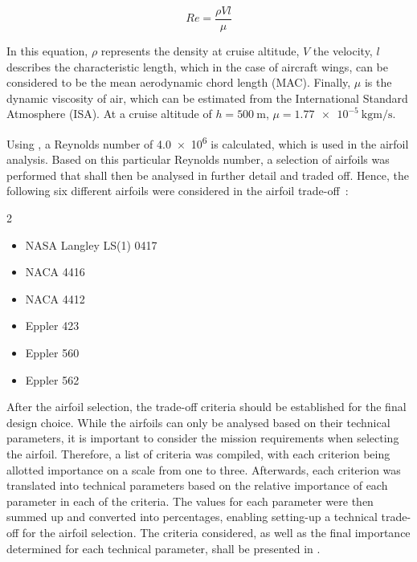 \begin{equation}
    \label{eq:reynolds}
    Re = \frac{\rho V l}{\mu} 
\end{equation}

In this equation, $\rho$ represents the density at cruise altitude, $V$ the velocity, $l$
describes the characteristic length,
which in the case of aircraft wings, can be considered to be the mean aerodynamic chord length (MAC).
Finally, $\mu$ is the dynamic viscosity of air, which can be estimated from the International Standard Atmosphere (ISA).
At a cruise altitude of $h=\qty{500}{\m}$, $\mu=\qty{1.77e-5}{\kg\m\per\s}$.

Using , a Reynolds number of \num{4.0e6} is calculated, which is used in the airfoil analysis.
Based on this particular Reynolds number, a selection of airfoils was performed that shall then be analysed in further detail and traded off.
Hence, the following six different airfoils were considered in the airfoil trade-off~\cite{Prelim_airfoil,Eppler423,eppler1990airfoil}:
\begin{multicols}{2}
\begin{itemize}
    \item NASA Langley LS(1) 0417
    \item NACA 4416
    \item NACA 4412
    \item Eppler 423
    \item Eppler 560
    \item Eppler 562
\end{itemize}
\end{multicols}
After the airfoil selection, the trade-off criteria should be established for the final design choice.
While the airfoils can only be analysed based on their technical parameters, it is important to consider the mission requirements when selecting the airfoil.
Therefore, a list of criteria was compiled, with each criterion being allotted importance on a scale from one to three.
Afterwards, each criterion was translated into technical parameters based on the relative importance of each parameter in each of the criteria.
The values for each parameter were then summed up and converted into percentages, enabling setting-up a technical trade-off for the airfoil selection.
The criteria considered, as well as the final importance determined for each technical parameter, shall be presented in .

